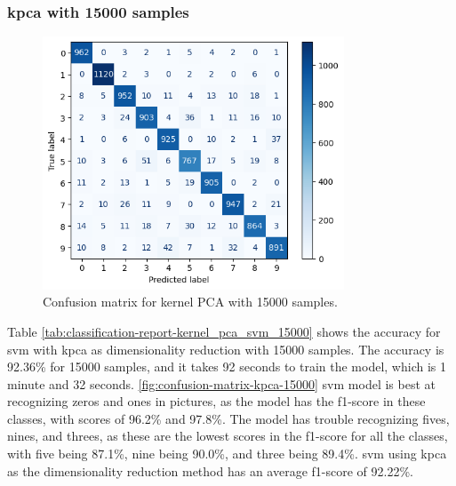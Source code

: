 \subsubsection{\gls{kpca} with 15000 samples}\label{subsubsec:experiment-1-results-kernel_pca-15000}
\begin{figure}[htb!]
    \centering
    \includegraphics[width=0.8\textwidth]{figures/1-experiment/confusion_matrix_kernel_pca_svm_15000.png}
    \caption{Confusion matrix for kernel PCA with 15000 samples.}
    \label{fig:confusion-matrix-kpca-15000}
\end{figure}
Table \ref{tab:classification-report-kernel_pca_svm_15000} shows the accuracy for \gls{svm} with \gls{kpca} as dimensionality reduction with 15000 samples. The accuracy is 92.36\% for 15000 samples, and it takes 92 seconds to train the model, which is 1 minute and 32 seconds. \autoref{fig:confusion-matrix-kpca-15000} \gls{svm} model is best at recognizing zeros and ones in pictures, as the model has the f1-score in these classes, with scores of 96.2\% and 97.8\%. The model has trouble recognizing fives, nines, and threes, as these are the lowest scores in the f1-score for all the classes, with five being 87.1\%, nine being 90.0\%, and three being 89.4\%. \gls{svm} using \gls{kpca} as the dimensionality reduction method has an average f1-score of 92.22\%.

